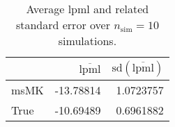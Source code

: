\begin{table}[H]

\caption{Average lpml and related standard error over $n_{\text{sim}} = 10$ simulations.}
\centering
\begin{tabular}[t]{lrr}
\toprule
  & $\overbar{\text{lpml}}$ & $\text{sd}(\overbar{\text{lpml}})$\\
\midrule
msMK & -13.78814 & 1.0723757\\
True & -10.69489 & 0.6961882\\
\bottomrule
\end{tabular}
\end{table}